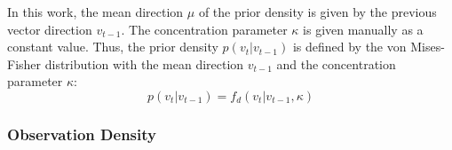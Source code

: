 In this work, the mean direction $\mu$ of the prior density is given by the previous vector direction ${v_{t - 1}}$. The concentration parameter $\kappa$ is given manually as a constant value. Thus, the prior density $p({v_t}|{v_{t - 1}})$ is defined by the von Mises-Fisher distribution with the mean direction ${v_{t - 1}}$ and the concentration parameter $\kappa$:
\begin{equation}
  p({v_t}|{v_{t - 1}}) = {f_d}({v_t}|{v_{t - 1}}, \kappa)
\end{equation}

\subsubsection{Observation Density}
